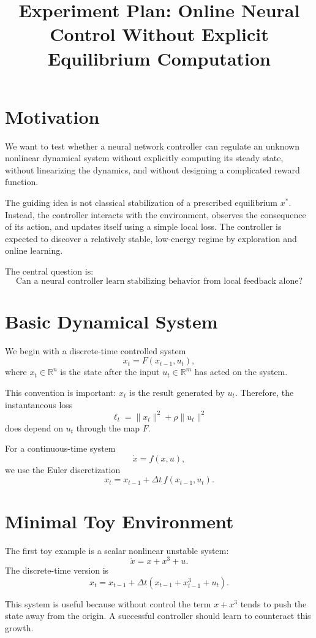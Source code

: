 \documentclass[11pt]{ctexart}
\title{Experiment Plan: Online Neural Control Without Explicit Equilibrium Computation}
\author{}
\date{}
\begin{document}
\maketitle

\section{Motivation}

We want to test whether a neural network controller can regulate an unknown nonlinear dynamical system without explicitly computing its steady state, without linearizing the dynamics, and without designing a complicated reward function.

The guiding idea is not classical stabilization of a prescribed equilibrium \(x^*\). Instead, the controller interacts with the environment, observes the consequence of its action, and updates itself using a simple local loss. The controller is expected to discover a relatively stable, low-energy regime by exploration and online learning.

The central question is:
\[
\text{Can a neural controller learn stabilizing behavior from local feedback alone?}
\]

\section{Basic Dynamical System}

We begin with a discrete-time controlled system
\[
x_t = F(x_{t-1},u_t),
\]
where \(x_t\in \mathbb R^n\) is the state after the input \(u_t\in \mathbb R^m\) has acted on the system.

This convention is important: \(x_t\) is the result generated by \(u_t\). Therefore, the instantaneous loss
\[
\ell_t = \|x_t\|^2 + \rho \|u_t\|^2
\]
does depend on \(u_t\) through the map \(F\).

For a continuous-time system
\[
\dot x = f(x,u),
\]
we use the Euler discretization
\[
x_t = x_{t-1} + \Delta t\, f(x_{t-1},u_t).
\]

\section{Minimal Toy Environment}

The first toy example is a scalar nonlinear unstable system:
\[
\dot x = x + x^3 + u.
\]
The discrete-time version is
\[
x_t = x_{t-1} + \Delta t\left(x_{t-1}+x_{t-1}^3+u_t\right).
\]

This system is useful because without control the term \(x+x^3\) tends to push the state away from the origin. A successful controller should learn to counteract this growth.
\end{document}
